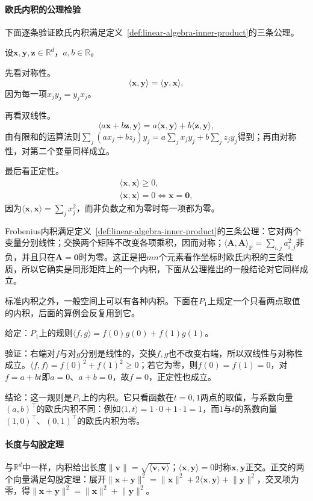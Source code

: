 \paragraph{欧氏内积的公理检验}

下面逐条验证欧氏内积满足定义~\ref{def:linear-algebra-inner-product}的三条公理。

设$\bm x,\bm y,\bm z\in\mathbb R^d$，$a,b\in\mathbb R$。

先看对称性。
\[
 \langle\bm x,\bm y\rangle=\langle\bm y,\bm x\rangle,
\]
因为每一项$x_jy_j=y_jx_j$。

再看双线性。
\[
 \langle a\bm x+b\bm z,\bm y\rangle=a\langle\bm x,\bm y\rangle+b\langle\bm z,\bm y\rangle,
\]
由有限和的运算法则$\sum_j(ax_j+bz_j)y_j=a\sum_jx_jy_j+b\sum_jz_jy_j$得到；再由对称性，对第二个变量同样成立。

最后看正定性。
\[
 \begin{gathered}
 \langle\bm x,\bm x\rangle\geq0,\\
 \langle\bm x,\bm x\rangle=0\iff\bm x=\bm0,
 \end{gathered}
\]
因为$\langle\bm x,\bm x\rangle=\sum_jx_j^2$，而非负数之和为零时每一项都为零。


Frobenius内积满足定义~\ref{def:linear-algebra-inner-product}的三条公理：它对两个变量分别线性；交换两个矩阵不改变各项乘积，因而对称；$\langle\bm A,\bm A\rangle_{\mathrm F}=\sum_{i,j}a_{i,j}^2$非负，并且只在$\bm A=\bm0$时为零。这正是把$mn$个元素看作坐标时欧氏内积的三条性质，所以它确实是同形矩阵上的一个内积，下面从公理推出的一般结论对它同样成立。

标准内积之外，一般空间上可以有各种内积。下面在$P_1$上规定一个只看两点取值的内积，后面的算例会反复用到它。
\begin{example}[只看两点取值的内积]
\label{ex:ls-two-point-inner-product}
给定：$P_1$上的规则$\langle f,g\rangle=f(0)g(0)+f(1)g(1)$。

验证：右端对$f$与对$g$分别是线性的，交换$f,g$也不改变右端，所以双线性与对称性成立。$\langle f,f\rangle=f(0)^2+f(1)^2\geq0$；若它为零，则$f(0)=f(1)=0$，对$f=a+bt$即$a=0$、$a+b=0$，故$f=0$，正定性也成立。

结论：这一规则是$P_1$上的内积。它只看函数在$t=0,1$两点的取值，与系数向量$(a,b)^\top$的欧氏内积不同：例如$\langle1,t\rangle=1\cdot0+1\cdot1=1$，而$1$与$t$的系数向量$(1,0)^\top$、$(0,1)^\top$的欧氏内积为零。
\end{example}

\paragraph{长度与勾股定理}
与$\mathbb R^d$中一样，内积给出长度$\lVert\bm v\rVert=\sqrt{\langle\bm v,\bm v\rangle}$；$\langle\bm x,\bm y\rangle=0$时称$\bm x,\bm y$正交。正交的两个向量满足勾股定理：展开$\lVert\bm x+\bm y\rVert^2=\lVert\bm x\rVert^2+2\langle\bm x,\bm y\rangle+\lVert\bm y\rVert^2$，交叉项为零，得$\lVert\bm x+\bm y\rVert^2=\lVert\bm x\rVert^2+\lVert\bm y\rVert^2$。

